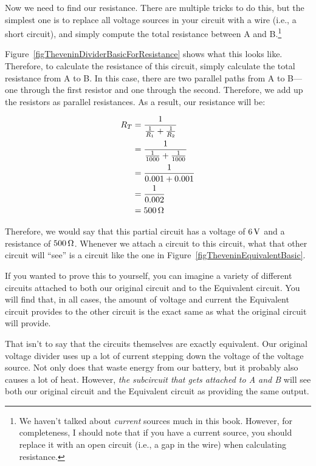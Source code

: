 Now we need to find our \thev resistance.
There are multiple tricks to do this, but the simplest one is to replace all voltage sources in your circuit with a wire (i.e., a short circuit), and simply compute the total resistance between A and B.\footnote{We haven't talked about \emph{current} sources much in this book.  However, for completeness, I should note that if you have a current source, you should replace it with an open circuit (i.e., a gap in the wire) when calculating \thev resistance.}


Figure~\ref{figTheveninDividerBasicForResistance} shows what this looks like.
Therefore, to calculate the \thev resistance of this circuit, simply calculate the total resistance from A to B.
In this case, there are two parallel paths from A to B---one through the first resistor and one through the second.
Therefore, we add up the resistors as parallel resistances.
As a result, our \thev resistance will be:

\begin{align*}
R_T &= \frac{1}{\frac{1}{R_1} + \frac{1}{R_2}} \\
    &= \frac{1}{\frac{1}{1000} + \frac{1}{1000}} \\
    &= \frac{1}{0.001 + 0.001} \\
    &= \frac{1}{0.002} \\
    &= 500\,\si{\ohm}
\end{align*}

Therefore, we would say that this partial circuit has a \thev voltage of $6\,\si{\volt}$ and a \thev resistance of $500\,\si{\ohm}$.
Whenever we attach a circuit to this circuit, what that other circuit will ``see'' is a circuit like the one in Figure~\ref{figTheveninEquivalentBasic}.


If you wanted to prove this to yourself, you can imagine a variety of different circuits attached to both our original circuit and to the \thev Equivalent circuit.
You will find that, in all cases, the amount of voltage and current the \thev Equivalent circuit provides to the other circuit is the exact same as what the original circuit will provide.

That isn't to say that the circuits themselves are exactly equivalent.
Our original voltage divider uses up a lot of current stepping down the voltage of the voltage source.
Not only does that waste energy from our battery, but it probably also causes a lot of heat.
However, \emph{the subcircuit that gets attached to A and B} will see both our original circuit and the \thev Equivalent circuit as providing the same output.

